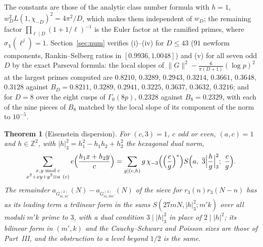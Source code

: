 \documentclass[11pt]{amsart}
\newtheorem{theorem}{Theorem}[section]
\theoremstyle{remark}
\newcommand{\Z}{\mathbb{Z}}
\begin{document}
The constants are those of the analytic class number formula with $h=1$, $w_D^2L(1,\chi_{-D})^2=4\pi^2/D$, which makes them independent of $w_D$; the remaining factor $\prod_{\ell\mid D}(1+1/\ell)^{-1}$ is the Euler factor at the ramified primes, where $\sigma_\chi(\ell^j)=1$. Section~\ref{sec:num} verifies (i)--(iv) for $D\le43$ ($91$ newform components, Rankin--Selberg ratios in $[0.9936,1.0048]$) and (v) for all seven odd $D$ by the exact Parseval formula: the local slopes of $\|G\|^2-\frac6{\pi(D+1)}(\log p)^2$ at the largest primes computed are $0.8210$, $0.3289$, $0.2943$, $0.3214$, $0.3661$, $0.3648$, $0.3128$ against $B_D=0.8211$, $0.3289$, $0.2941$, $0.3225$, $0.3637$, $0.3632$, $0.3216$; and for $D=8$ over the eight cusps of $\Gamma_0(8p)$, $0.2328$ against $B_8=0.2329$, with each of the nine pieces of $B_8$ matched by the local slope of its component of the norm to $10^{-5}$.

\begin{theorem}[Eisenstein dispersion]\label{thm:C}
For $(c,3)=1$, $c$ odd or even, $(a,c)=1$ and $h\in\Z^2$, with $|h|_3^2=h_1^2-h_1h_2+h_2^2$ the hexagonal dual norm,
\[
\sum_{\substack{x,y\bmod c\\ x^2+xy+y^2\equiv a\ (c)}}e\Bigl(\frac{h_1x+h_2y}c\Bigr)=\sum_{g\mid(c,h)}g\,\chi_{-3}\Bigl(\Bigl(\frac cg\Bigr)^{*}\Bigr)S\Bigl(a,\ \overline3\Bigl|\frac hg\Bigr|_3^2;\ \frac cg\Bigr).
\]
The remainder $a_{G^{(3)}_{m,m'}}(N)-a_{G^{(3)}_{m,3m'}}(N)$ of the sieve for $r_3(n)r_3(N-n)$ has as its leading term a trilinear form in the sums $S(\overline{27m}N,|h|_3^2;m'k)$ over all moduli $m'k$ prime to $3$, with a dual condition $3\mid|h|_3^2$ in place of $2\mid|h|^2$; its bilinear form in $(m',k)$ and the Cauchy--Schwarz and Poisson sizes are those of Part~III, and the obstruction to a level beyond $1/2$ is the same.
\end{theorem}
\end{document}
